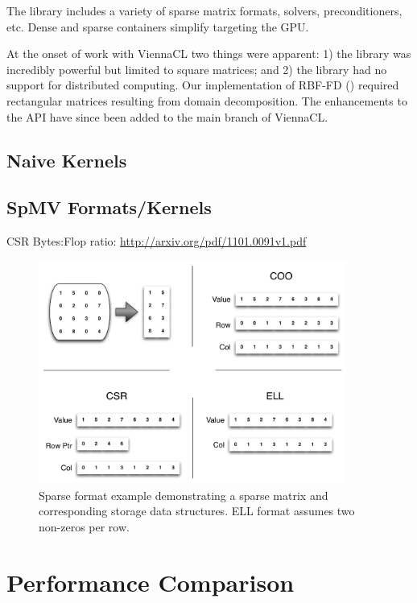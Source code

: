 \documentclass{report}
\begin{document}
The library includes a variety of sparse matrix formats, solvers, preconditioners, etc. Dense and sparse containers simplify targeting the GPU. 

At the onset of work with ViennaCL two things were apparent: 1) the library was incredibly powerful but limited to square matrices; and 2) the library had no support for distributed computing. Our implementation of RBF-FD (\cite{BolligRBFFDGPU}) required rectangular matrices resulting from domain decomposition. The enhancements to the API have since been added to the main branch of ViennaCL. 

\subsection{Naive Kernels}
\subsection{SpMV Formats/Kernels}


CSR Bytes:Flop ratio: \url{http://arxiv.org/pdf/1101.0091v1.pdf}

\begin{figure}
\centering
\includegraphics[width=0.9\textwidth]{gpu_content/omnigraffle/SparseStorage.pdf}
\caption{Sparse format example demonstrating a sparse matrix and corresponding storage data structures. ELL format assumes two non-zeros per row. }
\label{fig:sparse_format}
\end{figure}


\section{Performance Comparison}
\end{document}
